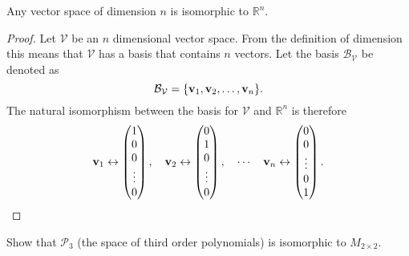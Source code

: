 \begin{thm}
    Any vector space of dimension $n$ is isomorphic to $\mathbb{R}^n$.
\end{thm}
\begin{proof}
    Let $\mathcal{V}$ be an $n$ dimensional vector space.  From the definition of
    dimension this means that $\mathcal{V}$ has a basis that contains $n$ vectors.  Let
    the basis $\mathcal{B}_{\mathcal{V}}$ be denoted as 
    \[ \mathcal{B}_{\mathcal{V}} = \{ {\bf v}_1, {\bf v}_2, \ldots, {\bf v}_n\}. \]
    The natural isomorphism between the basis for $\mathcal{V}$ and $\mathbb{R}^n$ is
    therefore
    \[ {\bf v}_1 \leftrightarrow \begin{pmatrix}1\\0\\0\\\vdots\\0\end{pmatrix}, \quad {\bf v}_2
    \leftrightarrow \begin{pmatrix}0\\1\\0\\\vdots\\0\end{pmatrix}, \quad \cdots \quad
{\bf v}_n \leftrightarrow \begin{pmatrix} 0\\0\\\vdots\\0\\1\end{pmatrix}. \]
\end{proof}

\begin{problem}
    Show that $\mathcal{P}_3$ (the space of third order polynomials) is isomorphic to
    $M_{2 \times 2}$.
\end{problem}

